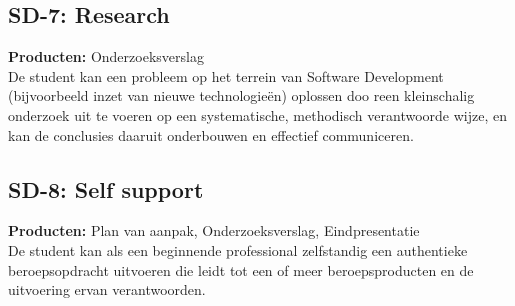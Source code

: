 \subsection{SD-7: Research}
\textbf{Producten:} Onderzoeksverslag \\
De student kan een probleem op het terrein van Software Development (bijvoorbeeld inzet van nieuwe technologieën) oplossen doo reen kleinschalig onderzoek uit te voeren op een systematische, methodisch verantwoorde wijze, en kan de conclusies daaruit onderbouwen en effectief communiceren.

\subsection{SD-8: Self support}
\textbf{Producten:} Plan van aanpak, Onderzoeksverslag, Eindpresentatie \\
De student kan als een beginnende professional zelfstandig een authentieke beroepsopdracht uitvoeren die leidt tot een of meer beroepsproducten en de uitvoering ervan verantwoorden.
